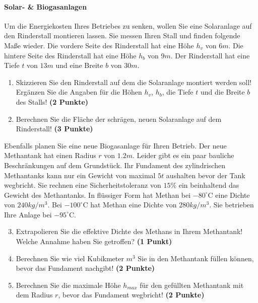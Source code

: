 \documentclass[a4paper, 10pt]{scrartcl}\usepackage[]{graphicx}\usepackage[]{xcolor}
\begin{document}
\paragraph{Solar- \& Biogasanlagen}



Um die Energiekosten Ihres Betriebes zu senken, wollen Sie eine Solaranlage
auf den Rinderstall montieren lassen. Sie messen Ihren Stall und finden
folgende Ma{\ss}e wieder. Die vordere Seite des Rinderstall hat eine H{\"o}he
$h_v$ von $6m$. Die hintere Seite des Rinderstall hat eine
H{\"o}he $h_b$ von $9m$. Der Rinderstall hat eine Tiefe $t$ von
$13m$ und eine Breite $b$ von $30m$.

\begin{enumerate}
\item Skizzieren Sie den Rinderstall auf dem die Solaranlage montiert
  werden soll! Erg{\"a}nzen Sie die Angaben f{\"u}r die H{\"o}hen $h_v$, $h_b$, die
  Tiefe $t$ und die Breite $b$ des Stalls!  \textbf{(2 Punkte)}
\item Berechnen Sie die Fl{\"a}che der schr{\"a}gen, neuen Solaranlage auf dem
  Rinderstall! \textbf{(3 Punkte)}
\end{enumerate}

Ebenfalls planen Sie eine neue Biogasanlage f{\"u}r Ihren Betrieb. Der neue
Methantank hat einen Radius $r$ von $1.2m$. Leider gibt es ein
paar bauliche Beschr{\"a}nkungen auf dem Grundst{\"u}ck. Ihr Fundament des
zylindrischen Methantanks kann nur ein Gewicht von maximal
$5t$ aushalten bevor der Tank wegbricht. Sie rechnen eine
Sicherheitstoleranz von $15\%$ ein beinhaltend das Gewicht des
Methantanks. In fl{\"u}ssiger Form hat
Methan bei $-80^\circ\text{C}$ eine Dichte von
$240kg/m^3$. Bei $-100^\circ\text{C}$ hat Methan eine Dichte
von $280kg/m^3$. Sie betrieben Ihre Anlage bei
$-95^\circ\text{C}$.

\begin{enumerate}
  \setcounter{enumi}{2}
\item Extrapolieren Sie die effektive Dichte des Methans in Ihrem
  Methantank! Welche Annahme haben Sie getroffen? \textbf{(1 Punkt)}
\item Berechnen Sie wie viel Kubikmeter $m^3$ Sie in den Methantank f{\"u}llen
  k{\"o}nnen, bevor das Fundament nachgibt! \textbf{(2 Punkte)}
\item Berechnen Sie die maximale H{\"o}he $h_{max}$ f{\"u}r den gef{\"u}llten
  Methantank mit dem Radius $r$, bevor das Fundament wegbricht! \textbf{(2
    Punkte)}
\end{enumerate}
\end{document}

